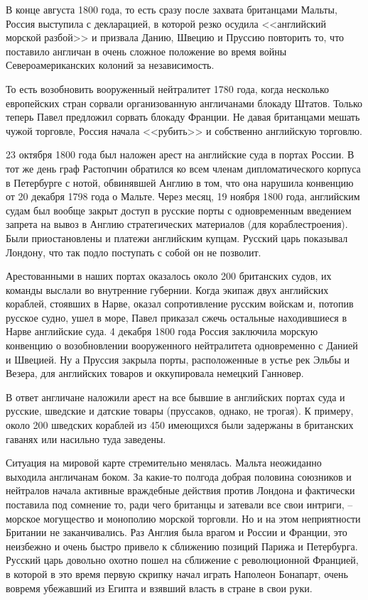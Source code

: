 \documentclass[a4paper,12pt]{diss_4}
\begin{document}
 В конце августа 1800 года, то есть сразу после захвата британцами Мальты, Россия выступила с декларацией, в которой резко осудила <<английский морской разбой>> и призвала Данию, Швецию и Пруссию повторить то, что поставило англичан в очень сложное положение во время войны Североамериканских колоний за независимость. 

 То есть возобновить вооруженный нейтралитет 1780 года, когда несколько европейских стран сорвали организованную англичанами блокаду Штатов. Только теперь Павел предложил сорвать блокаду Франции. Не давая британцами мешать чужой торговле, Россия начала <<рубить>> и собственно английскую торговлю. 

 23 октября 1800 года был наложен арест на английские суда в портах России. В тот же день граф Растопчин обратился ко всем членам дипломатического корпуса в Петербурге с нотой, обвинявшей Англию в том, что она нарушила конвенцию от 20 декабря 1798 года о Мальте. Через месяц, 19 ноября 1800 года, английским судам был вообще закрыт доступ в русские порты с одновременным введением запрета на вывоз в Англию стратегических материалов (для кораблестроения). Были приостановлены и платежи английским купцам. Русский царь показывал Лондону, что так подло поступать с собой он не позволит.

 Арестованными в наших портах оказалось около 200 британских судов, их команды выслали во внутренние губернии. Когда экипаж двух английских кораблей, стоявших в Нарве, оказал сопротивление русским войскам и, потопив русское судно, ушел в море, Павел приказал сжечь остальные находившиеся в Нарве английские суда. 4 декабря 1800 года Россия заключила морскую конвенцию о возобновлении вооруженного нейтралитета одновременно с Данией и Швецией. Ну а Пруссия закрыла порты, расположенные в устье рек Эльбы и Везера, для английских товаров и оккупировала немецкий Ганновер.

 В ответ англичане наложили арест на все бывшие в английских портах суда и русские, шведские и датские товары (пруссаков, однако, не трогая). К примеру, около 200 шведских кораблей из 450 имеющихся были задержаны в британских гаванях или насильно туда заведены.

 Ситуация на мировой карте стремительно менялась. Мальта неожиданно выходила англичанам боком. За какие-то полгода добрая половина союзников и нейтралов начала активные враждебные действия против Лондона и фактически поставила под сомнение то, ради чего британцы и затевали все свои интриги, -- морское могущество и монополию морской торговли. Но и на этом неприятности Британии не заканчивались. Раз Англия была врагом и России и Франции, это неизбежно и очень быстро привело к сближению позиций Парижа и Петербурга. Русский царь довольно охотно пошел на сближение с революционной Францией, в которой в это время первую скрипку начал играть Наполеон Бонапарт, очень вовремя убежавший из Египта и взявший власть в стране в свои руки.
\end{document}
